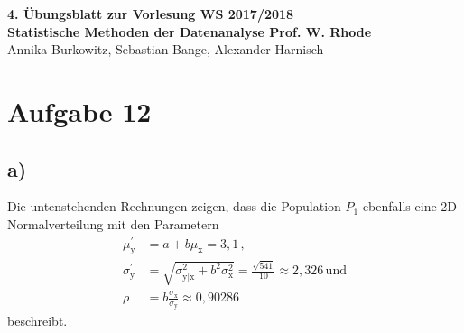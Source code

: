 \documentclass[a4paper, 11pt]{article}
\begin{document}
\noindent
\large{\textbf{4. Übungsblatt zur Vorlesung \hfill WS 2017/2018 \\
Statistische Methoden der Datenanalyse \hfill Prof. W. Rhode}} \\
Annika Burkowitz, Sebastian Bange, Alexander Harnisch \\
\noindent\makebox[\linewidth]{\rule{\textwidth}{0.4pt}}

\section*{Aufgabe 12}
\subsection*{a)}
Die untenstehenden Rechnungen zeigen, dass die Population $P_1$ ebenfalls eine
2D Normalverteilung mit den Parametern
\begin{align*}
  \mu_\text{y}^{'} &= a + b\mu_\text{x}=3,1\,, \\
  \sigma_\text{y}^{'} &= \sqrt{\sigma_\text{y|x}^2+b^2\sigma_\text{x}^2}
    = \frac{\sqrt{541}}{10} \approx 2,326\, \text{und}\\
  \rho &= b \frac{\sigma_\text{x}}{\sigma_\text{y}} \approx 0,90286
\end{align*}
beschreibt.
\end{document}
